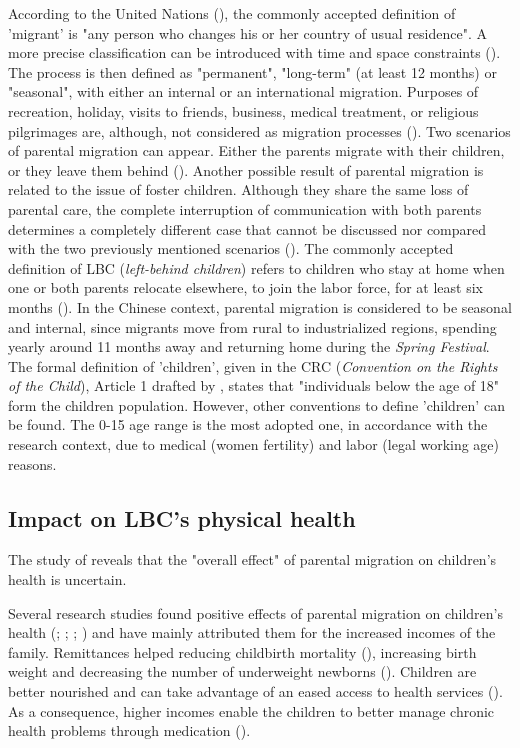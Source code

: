 According to the United Nations (\cite{united1998recommendations}), the commonly accepted definition of 'migrant' is "any person who changes his or her country of usual residence". A more precise classification can be introduced with time and space constraints (\cite{rossi2008impact}). The process is then defined as "permanent", "long-term" (at least 12 months) or "seasonal", with either an internal or an international migration. Purposes of recreation, holiday, visits to friends, business, medical treatment, or religious pilgrimages are, although, not considered as migration processes (\cite{united1998recommendations}). Two scenarios of parental migration can appear. Either the parents migrate with their children, or they leave them behind (\cite{rossi2008impact}). Another possible result of parental migration is related to the issue of foster children. Although they share the same loss of parental care, the complete interruption of communication with both parents determines a completely different case that cannot be discussed nor compared with the two previously mentioned scenarios (\cite{pilon2003foster}). The commonly accepted definition of LBC (\textit{left-behind children}) refers to children who stay at home when one or both parents relocate elsewhere, to join the labor force, for at least six months (\cite{lu2011left}). In the Chinese context, parental migration is considered to be seasonal and internal, since migrants move from rural to industrialized regions, spending yearly around 11 months away and returning home during the \textit{Spring Festival}. The formal definition of 'children', given in the CRC (\textit{Convention on the Rights of the Child}), Article 1 drafted by \textcite{unicef1989convention}, states that "individuals below the age of 18" form the children population. However, other conventions to define 'children' can be found. The 0-15 age range is the most adopted one, in accordance with the research context, due to medical (women fertility) and labor (legal working age) reasons.

\subsection{Impact on LBC's physical health}
\label{subsec:impact_physical_health}

The study of \textcite{guo2017effect} reveals that the "overall effect" of parental migration on children's health is uncertain. 

Several research studies found positive effects of parental migration on children's health (\cite{mundial2006development}; \cite{acosta2007impact}; \cite{anton2010impact}; \cite{stillman2012impact}) and have mainly attributed them for the increased incomes of the family. Remittances helped reducing childbirth mortality (\cite{hildebrandt2005effects}), increasing birth weight and decreasing the number of underweight newborns (\cite{frank2002other}). Children are better nourished and can take advantage of an eased access to health services (\cite{nobles2006contribution}). As a consequence, higher incomes enable the children to better manage chronic health problems through medication (\cite{case2002economic}).

